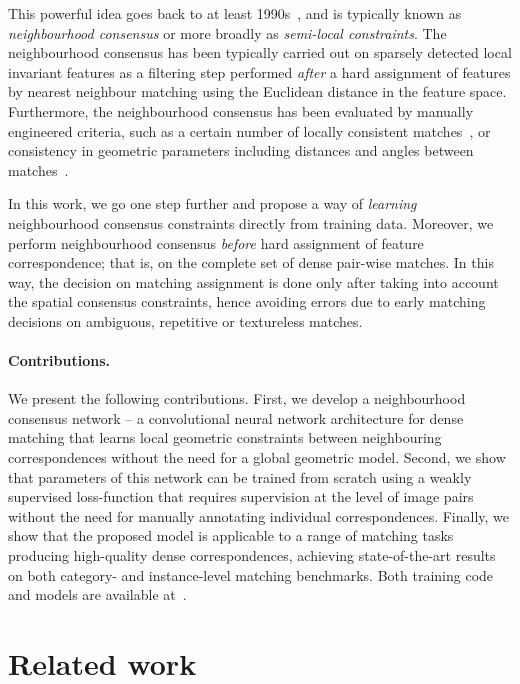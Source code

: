 \documentclass{article}
\begin{document}
This powerful idea goes back to at least 1990s~\cite{zhang1995robust,schmid1997local,Schaffalitzky02a,Sivic03,bian2017gms}, and is typically known as \emph{neighbourhood consensus} or more broadly as \emph{semi-local constraints}. The neighbourhood consensus has been typically carried out on sparsely detected local invariant features as a filtering step performed \emph{after} a hard assignment of features by nearest neighbour matching using the Euclidean distance in the feature space. 
Furthermore, the neighbourhood consensus has been evaluated by  manually engineered criteria,
such as a certain number of locally consistent matches~\cite{Schaffalitzky02a,Sivic03,bian2017gms}, or consistency in geometric parameters including distances and angles between matches~\cite{zhang1995robust,schmid1997local}. 

In this work, we go one step further and propose a way of \emph{learning} neighbourhood consensus constraints directly from training data. Moreover, we perform neighbourhood consensus \emph{before} hard assignment of feature correspondence; that is, on the complete set of dense pair-wise matches. In this way, the decision on matching assignment is done only after taking into account the spatial consensus constraints, hence avoiding errors due to early matching decisions on ambiguous, repetitive or textureless matches.

\paragraph{Contributions.} We present the following contributions. First, we develop a neighbourhood consensus network -- a convolutional neural network architecture for dense matching that learns local geometric constraints between neighbouring correspondences without the need for a global geometric model. Second, we show that parameters of this network can be trained from scratch using a weakly supervised loss-function that requires supervision at the level of image pairs without the need for manually annotating individual correspondences.  Finally, we show that the proposed model is applicable to a range of matching tasks producing high-quality dense correspondences, achieving state-of-the-art results on both category- and instance-level matching benchmarks. Both training code and models are available at~\cite{website}.

\section{Related work}
\end{document}
